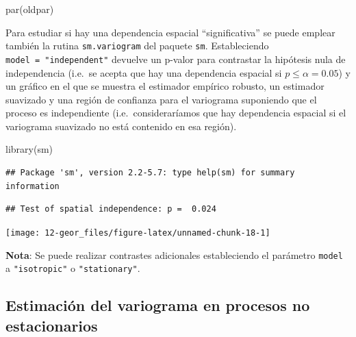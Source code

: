 \documentclass[
  spanish,
]{book}
\newenvironment{Shaded}{\begin{snugshade}}{\end{snugshade}}
\newcommand{\AttributeTok}[1]{\textcolor[rgb]{0.77,0.63,0.00}{#1}}
\newcommand{\FunctionTok}[1]{\textcolor[rgb]{0.00,0.00,0.00}{#1}}
\newcommand{\NormalTok}[1]{#1}
\newcommand{\SpecialCharTok}[1]{\textcolor[rgb]{0.00,0.00,0.00}{#1}}
\newcommand{\StringTok}[1]{\textcolor[rgb]{0.31,0.60,0.02}{#1}}
\theoremstyle{break}
\begin{document}
\begin{Shaded}
\begin{Highlighting}[]
\FunctionTok{par}\NormalTok{(oldpar)     }
\end{Highlighting}
\end{Shaded}

Para estudiar si hay una dependencia espacial ``significativa'' se puede
emplear también la rutina \texttt{sm.variogram} del paquete \texttt{sm}.
Estableciendo \texttt{model\ =\ "independent"}
devuelve un p-valor para contrastar la hipótesis nula de independencia
(i.e.~se acepta que hay una dependencia espacial si \(p \leq \alpha = 0.05\))
y un gráfico en el que se muestra el estimador empírico robusto, un estimador
suavizado y una región de confianza para el variograma suponiendo que el
proceso es independiente (i.e.~consideraríamos que hay dependencia
espacial si el variograma suavizado no está contenido en esa región).

\begin{Shaded}
\begin{Highlighting}[]
\FunctionTok{library}\NormalTok{(sm)}
\end{Highlighting}
\end{Shaded}

\begin{verbatim}
## Package 'sm', version 2.2-5.7: type help(sm) for summary information
\end{verbatim}

\begin{Shaded}
\end{Shaded}

\begin{verbatim}
## Test of spatial independence: p =  0.024
\end{verbatim}

\begin{center}\texttt{[image: 12-geor\_files/figure-latex/unnamed-chunk-18-1]} \end{center}

\textbf{Nota}: Se puede realizar contrastes adicionales estableciendo el parámetro \texttt{model}
a \texttt{"isotropic"} o \texttt{"stationary"}.

\hypertarget{estimaciuxf3n-del-variograma-en-procesos-no-estacionarios}{%
\subsection{Estimación del variograma en procesos no estacionarios}\label{estimaciuxf3n-del-variograma-en-procesos-no-estacionarios}}
\end{document}
